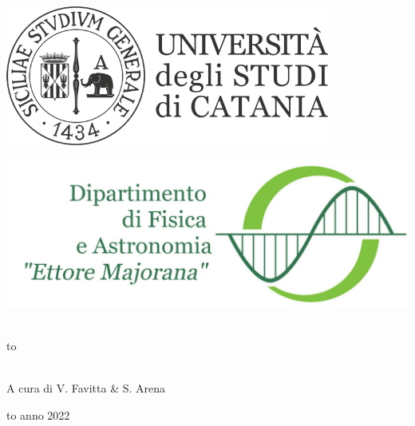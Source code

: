 \documentclass[openany,12pt]{book}%
\newcommand\blankpage{%
    \null
    \thispagestyle{empty}%
    \newpage}
\begin{document}
\thispagestyle{empty}
\begin{center}

\begin{minipage}[c]{0.45\textwidth}
\begin{flushleft}
\includegraphics[width=0.8\textwidth]{logo-unict-orizzontale-grigio.png}
\end{flushleft}
\end{minipage}
\hfill
\begin{minipage}[c]{0.45\textwidth}
\begin{flushright}
\includegraphics[width=\textwidth]{logo_dfa_orizzontale}
\end{flushright}
\end{minipage}\\
\medskip
\hbox to \textwidth{\hrulefill}

\vfill
\vfill

\uppercase{}\\

\vfill
\large{A cura di V. Favitta \& S. Arena }

\vfill
\vfill
\hbox to \textwidth{\hrulefill}
{\sc anno 2022}
\end{center}

\afterpage{\blankpage}
\newpage
\end{document}
